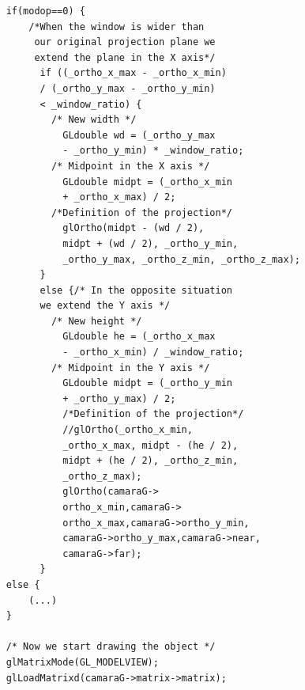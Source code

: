 \documentclass[12pt,a4paper]{article}
\begin{document}
\begin{enumerate}
\begin{enumerate}
\begin{lstlisting}
    if(modop==0) {
        /*When the window is wider than
         our original projection plane we
         extend the plane in the X axis*/
          if ((_ortho_x_max - _ortho_x_min)
          / (_ortho_y_max - _ortho_y_min)
          < _window_ratio) {
            /* New width */
              GLdouble wd = (_ortho_y_max
              - _ortho_y_min) * _window_ratio;
            /* Midpoint in the X axis */
              GLdouble midpt = (_ortho_x_min
              + _ortho_x_max) / 2;
            /*Definition of the projection*/
              glOrtho(midpt - (wd / 2),
              midpt + (wd / 2), _ortho_y_min,
              _ortho_y_max, _ortho_z_min, _ortho_z_max);
          } 
          else {/* In the opposite situation
          we extend the Y axis */
            /* New height */
              GLdouble he = (_ortho_x_max
              - _ortho_x_min) / _window_ratio;
            /* Midpoint in the Y axis */
              GLdouble midpt = (_ortho_y_min
              + _ortho_y_max) / 2;
              /*Definition of the projection*/
              //glOrtho(_ortho_x_min,
              _ortho_x_max, midpt - (he / 2),
              midpt + (he / 2), _ortho_z_min,
              _ortho_z_max);
              glOrtho(camaraG->
              ortho_x_min,camaraG->
              ortho_x_max,camaraG->ortho_y_min,
              camaraG->ortho_y_max,camaraG->near,
              camaraG->far);
          }
    else {
		(...)
    }

    /* Now we start drawing the object */
    glMatrixMode(GL_MODELVIEW);
    glLoadMatrixd(camaraG->matrix->matrix);
\end{lstlisting}
\end{enumerate}
\end{enumerate}
\end{document}
